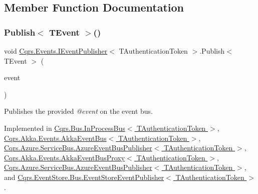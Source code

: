 \subsection{Member Function Documentation}
\mbox{\label{interfaceCqrs_1_1Events_1_1IEventPublisher_a02f0db0bc9b3aa1c7f766f58f8422ee3_a02f0db0bc9b3aa1c7f766f58f8422ee3}} 
\subsubsection{\texorpdfstring{Publish$<$ T\+Event $>$()}{Publish< TEvent >()}\hspace{0.1cm}{\footnotesize\ttfamily [1/2]}}
{\footnotesize\ttfamily void \hyperlink{interfaceCqrs_1_1Events_1_1IEventPublisher}{Cqrs.\+Events.\+I\+Event\+Publisher}$<$ T\+Authentication\+Token $>$.Publish$<$ T\+Event $>$ (\begin{DoxyParamCaption}\item[{T\+Event @}]{event }\end{DoxyParamCaption})}



Publishes the provided {\itshape @event}  on the event bus. 



Implemented in \hyperlink{classCqrs_1_1Bus_1_1InProcessBus_afd3d41a5f27a985e9d6ccf3f6f77f11a_afd3d41a5f27a985e9d6ccf3f6f77f11a}{Cqrs.\+Bus.\+In\+Process\+Bus$<$ T\+Authentication\+Token $>$}, \hyperlink{classCqrs_1_1Akka_1_1Events_1_1AkkaEventBus_aaba5d37020e21d03cc2bbc3da14f45ea_aaba5d37020e21d03cc2bbc3da14f45ea}{Cqrs.\+Akka.\+Events.\+Akka\+Event\+Bus$<$ T\+Authentication\+Token $>$}, \hyperlink{classCqrs_1_1Azure_1_1ServiceBus_1_1AzureEventBusPublisher_a175365f8217cfe163ffadc891f0cd3e3_a175365f8217cfe163ffadc891f0cd3e3}{Cqrs.\+Azure.\+Service\+Bus.\+Azure\+Event\+Bus\+Publisher$<$ T\+Authentication\+Token $>$}, \hyperlink{classCqrs_1_1Akka_1_1Events_1_1AkkaEventBusProxy_a656daead2fe6f30487855dbaea5a3c83_a656daead2fe6f30487855dbaea5a3c83}{Cqrs.\+Akka.\+Events.\+Akka\+Event\+Bus\+Proxy$<$ T\+Authentication\+Token $>$}, \hyperlink{classCqrs_1_1Azure_1_1ServiceBus_1_1AzureEventBusPublisher_a175365f8217cfe163ffadc891f0cd3e3_a175365f8217cfe163ffadc891f0cd3e3}{Cqrs.\+Azure.\+Service\+Bus.\+Azure\+Event\+Bus\+Publisher$<$ T\+Authentication\+Token $>$}, and \hyperlink{classCqrs_1_1EventStore_1_1Bus_1_1EventStoreEventPublisher_a1ebb6f08648bdfd5c5bd29fcc12adfea_a1ebb6f08648bdfd5c5bd29fcc12adfea}{Cqrs.\+Event\+Store.\+Bus.\+Event\+Store\+Event\+Publisher$<$ T\+Authentication\+Token $>$}.

